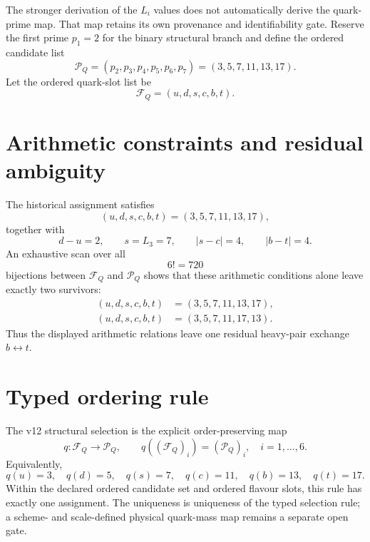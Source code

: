 The stronger derivation of the \(L_i\) values does not automatically derive the
quark-prime map.  That map retains its own provenance and identifiability gate.
Reserve the first prime \(p_1=2\) for the binary structural branch and define the
ordered candidate list
\begin{equation}
\mathcal P_Q
=(p_2,p_3,p_4,p_5,p_6,p_7)
=(3,5,7,11,13,17).
\label{eq:v12-prime-candidate-list}
\end{equation}
Let the ordered quark-slot list be
\begin{equation}
\mathcal F_Q=(u,d,s,c,b,t).
\label{eq:v12-quark-slot-list}
\end{equation}

\section{Arithmetic constraints and residual ambiguity}

The historical assignment satisfies
\begin{equation}
(u,d,s,c,b,t)=(3,5,7,11,13,17),
\label{eq:v12-quark-prime-assignment}
\end{equation}
together with
\[
d-u=2,
\qquad
s=L_3=7,
\qquad
|s-c|=4,
\qquad
|b-t|=4.
\]
An exhaustive scan over all
\[
6!=720
\]
bijections between \(\mathcal F_Q\) and \(\mathcal P_Q\) shows that these
arithmetic conditions alone leave exactly two survivors:
\begin{align}
(u,d,s,c,b,t)&=(3,5,7,11,13,17),\\
(u,d,s,c,b,t)&=(3,5,7,11,17,13).
\end{align}
Thus the displayed arithmetic relations leave one residual heavy-pair exchange
\(b\leftrightarrow t\).

\section{Typed ordering rule}

The v12 structural selection is the explicit order-preserving map
\begin{equation}
\boxed{
q:\mathcal F_Q\to\mathcal P_Q,
\qquad
q((\mathcal F_Q)_i)=(\mathcal P_Q)_i,
\quad i=1,\ldots,6.
}
\label{eq:v12-quark-prime-typed-rule}
\end{equation}
Equivalently,
\[
q(u)=3,\quad q(d)=5,\quad q(s)=7,\quad q(c)=11,\quad q(b)=13,\quad q(t)=17.
\]
Within the declared ordered candidate set and ordered flavour slots, this rule
has exactly one assignment.  The uniqueness is uniqueness of the typed
selection rule; a scheme- and scale-defined physical quark-mass map remains a
separate open gate.

